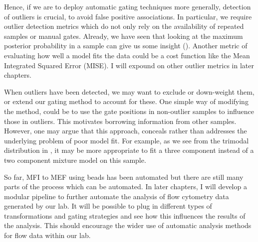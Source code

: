 Hence, if we are to deploy automatic gating techniques more generally, detection of outliers is crucial, to avoid false positive associations.
In particular, we require outlier detection metrics which do not only rely on the availability of repeated samples or manual gates.
Already, we have seen that looking at the maximum posterior probability in a sample can give us some insight ().
Another metric of evaluating how well a model fits the data could be a cost function like the Mean Integrated Squared Error (MISE).
I will expound on other outlier metrics in later chapters.

When outliers have been detected, we may want to exclude or down-weight them, or extend our gating method to account for these.
One simple way of modifying the method, could be to use the gate positions in non-outlier samples to influence those in outliers.
This motivates borrowing information from other samples.
However, one may argue that this approach, conceals rather than addresses the underlying problem of poor model fit.
For example, as we see from the trimodal distribution in ,
it may be more appropriate to fit a three component instead of a two component mixture model on this sample.

So far, MFI to MEF using beads has been automated but there are still many parts of the process which can be automated.
In later chapters, I will develop a modular pipeline to further automate the analysis of flow cytometry data generated by our lab.
It will be possible to plug in different types of transformations and gating strategies and see how this influences
the results of the analysis.
This should encourage the wider use of automatic analysis methods for flow data within our lab.



